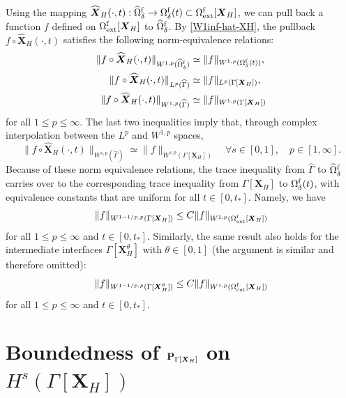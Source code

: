 \documentclass[11pt,reqno]{amsart}
\theoremstyle{definition}
\theoremstyle{plain}
\numberwithin{theorem}{section}
\numberwithin{proposition}{section}
\numberwithin{lemma}{section}
\numberwithin{equation}{section}
\newcommand{\bs}[1]{\boldsymbol{#1}}
\renewcommand{\(}{\bigl(}
\renewcommand{\)}{\bigr)}
\begin{document}
Using the mapping $\widehat{\bs X}_H(\cdot,t): \widehat{\Omega}^{\rm f}_\delta \to \Omega^{\rm f}_\delta(t)\subset \Omega^{\rm f}_{\rm ext}[{\bs X}_H]$, we can pull back a function $f$ defined on $\Omega^{\rm f}_{\rm ext}[{\bs X}_H]$ to $\widehat{\Omega}^{\rm f}_\delta$. By \eqref{W1inf-hat-XH}, the pullback $f\circ \widehat{\bs X}_H(\cdot,t)$ satisfies the following norm-equivalence relations:
\begin{align*}
\begin{aligned}
 \|f\circ \widehat{\bs X}_H(\cdot,t)\|_{W^{1,p}(\widehat{\Omega}^{\rm f}_\delta)}
&\simeq \|f\|_{W^{1,p}(\Omega^{\rm f}_\delta(t))} , \\
 \|f\circ \widehat{\bs X}_H(\cdot,t)\|_{L^p(\widehat\Gamma)}
&\simeq \|f\|_{L^p(\Gamma[{\bs X}_H])} , \\
\|f\circ \widehat{\bs X}_H(\cdot,t)\|_{W^{1,p}(\widehat\Gamma)}
&\simeq \|f\|_{W^{1,p}(\Gamma[{\bs X}_H])}
\end{aligned}
\end{align*}
for all $1 \le p\le \infty$.
The last two inequalities imply that, through complex interpolation between the $L^p$ and $W^{1,p}$ spaces, 
$$
\|f\circ \widehat{\bs X}_H(\cdot,t)\|_{W^{s,p}(\widehat\Gamma)}
\simeq \|f\|_{W^{s,p}(\Gamma[{\bs X}_H])}
\quad \forall  s \in [0,1], \quad  p \in [1,\infty] . 
$$
Because of these norm equivalence relations, the trace inequality from $\widehat\Gamma$ to $\widehat{\Omega}^{\rm f}_\delta$ carries over to the corresponding trace inequality from $\Gamma[{\bs X}_H]$ to $\Omega^{\rm f}_\delta(t)$, with equivalence constants that are uniform for all $t\in[0,t_*]$. Namely, we have 
$$
\|f\|_{W^{1-1/p,p}(\Gamma[{\bs X}_H])}
 \le C\|f\|_{W^{1,p}(\Omega^{\rm f}_{\rm ext}[{\bs X}_H])} 
$$
for all $ 1\le p\le \infty$ and $t\in[0,t_*]$. 
Similarly, the same result also holds for the intermediate interfaces $\Gamma[{\bs X}_H^\theta]$ with $\theta\in[0,1]$ (the argument is similar and therefore omitted): 
$$
\|f\|_{W^{1-1/p,p}(\Gamma[{\bs X}_H^\theta])}
 \le C\|f\|_{W^{1,p}(\Omega^{\rm f}_{\rm ext}[{\bs X}_H])} 
$$
for all $ 1\le p\le \infty$ and $t\in[0,t_*]$. 

\section{Boundedness of \texorpdfstring{${\bf P}_{\Gamma[{\bs X}_H]}$}{x} on \texorpdfstring{$H^s(\Gamma[{\bs X}_H])$}{x}}
\label{appendix:L2-projection}
\end{document}
